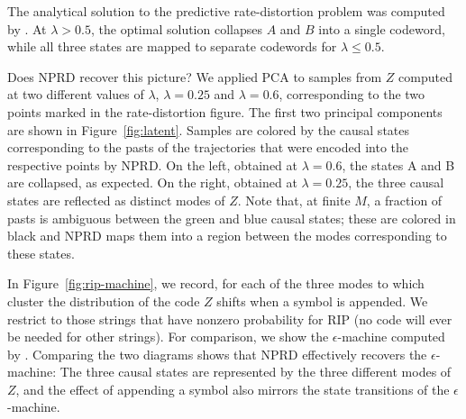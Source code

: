 \documentclass[11pt,letterpaper]{article}
\begin{document}
The analytical solution to the predictive rate-distortion problem was computed by \cite{marzen-predictive-2016}.
At $\lambda > 0.5$, the optimal solution collapses $A$ and $B$ into a single codeword, while all three states are mapped to separate codewords for $\lambda \leq 0.5$.


Does NPRD recover this picture?
We applied PCA to samples from $Z$ computed at two different values of $\lambda$, $\lambda = 0.25$ and $\lambda = 0.6$, corresponding to the two points marked in the rate-distortion figure.
The first two principal components are shown in Figure~\ref{fig:latent}.
Samples are colored by the causal states corresponding to the pasts of the trajectories that were encoded into the respective points by NPRD.
On the left, obtained at $\lambda=0.6$, the states A and B are collapsed, as expected.
On the right, obtained at $\lambda=0.25$, the three causal states are reflected as distinct modes of $Z$.
Note that, at finite $M$, a fraction of pasts is ambiguous between the green and blue causal states; these are colored in black and NPRD maps them into a region between the modes corresponding to these states.

In Figure~\ref{fig:rip-machine}, we record, for each of the three modes to which cluster the distribution of the code $Z$ shifts when a symbol is appended.
We restrict to those strings that have nonzero probability for RIP (no code will ever be needed for other strings).
For comparison, we show the $\epsilon$-machine computed by \cite{marzen-predictive-2016}.
Comparing the two diagrams shows that NPRD effectively recovers the $\epsilon$-machine:
The three causal states are represented by the three different modes of $Z$, and the effect of appending a symbol also mirrors the state transitions of the $\epsilon$-machine.
\end{document}
